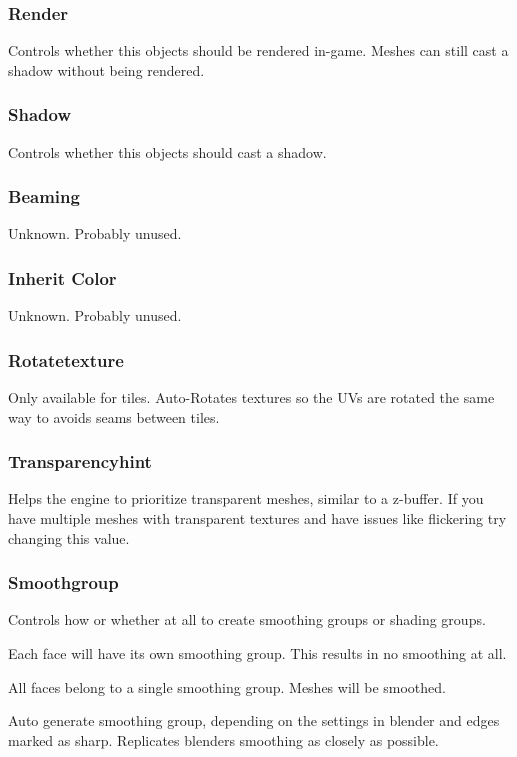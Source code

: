 \subsubsection*{Render}
Controls whether this objects should be rendered in-game. Meshes can still
cast a shadow without being rendered.

\subsubsection*{Shadow}
Controls whether this objects should cast a shadow.

\subsubsection*{Beaming}
Unknown. Probably unused.

\subsubsection*{Inherit Color}
Unknown. Probably unused.

\subsubsection*{Rotatetexture}
Only available for tiles. Auto-Rotates textures so the UVs are rotated
the same way to avoids seams between tiles.

\subsubsection*{Transparencyhint}
Helps the engine to prioritize transparent meshes, similar to a z-buffer. If
you have multiple meshes with transparent textures and have issues like
flickering try changing this value.

\subsubsection*{Smoothgroup}
Controls how or whether at all to create smoothing groups or shading groups.
\begin{description}[leftmargin=6em,style=nextline]
    \item[Separate] Each face will have its own smoothing group. This results in no smoothing at all.
    \item[Single] All faces belong to a single smoothing group. Meshes will be smoothed.
    \item[Auto] Auto generate smoothing group, depending on the settings in blender and edges marked as sharp. Replicates blenders smoothing as closely as possible.
\end{description}

